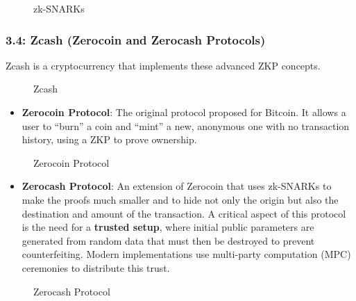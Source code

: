 \begin{figure}
\centering
\caption{zk-SNARKs}
\end{figure}

\subsubsection{3.4: Zcash (Zerocoin and Zerocash
Protocols)}\label{zcash-zerocoin-and-zerocash-protocols}

Zcash is a cryptocurrency that implements these advanced ZKP concepts.

\begin{figure}
\centering
\caption{Zcash}
\end{figure}

\begin{itemize}
\tightlist
\item
  \textbf{Zerocoin Protocol}: The original protocol proposed for
  Bitcoin. It allows a user to ``burn'' a coin and ``mint'' a new,
  anonymous one with no transaction history, using a ZKP to prove
  ownership.
\end{itemize}

\begin{figure}
\centering
\caption{Zerocoin Protocol}
\end{figure}

\begin{itemize}
\tightlist
\item
  \textbf{Zerocash Protocol}: An extension of Zerocoin that uses
  zk-SNARKs to make the proofs much smaller and to hide not only the
  origin but also the destination and amount of the transaction. A
  critical aspect of this protocol is the need for a \textbf{trusted
  setup}, where initial public parameters are generated from random data
  that must then be destroyed to prevent counterfeiting. Modern
  implementations use multi-party computation (MPC) ceremonies to
  distribute this trust.
\end{itemize}

\begin{figure}
\centering
\caption{Zerocash Protocol}
\end{figure}

